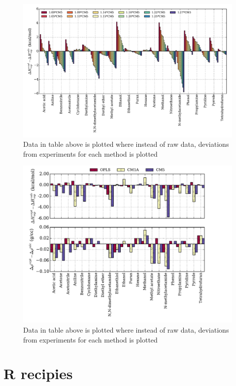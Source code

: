 \documentclass[11pt,fleqn]{book} %
\begin{document}
\begin{figure}
\includegraphics[scale=0.80]{../python_recipies/Thh.pdf}
\caption{Data in table above is plotted where instead of raw data, deviations from experiments for each method is plotted}
\end{figure}
\pagebreak 

\begin{figure}
\includegraphics[scale=0.80]{../python_recipies/Multi_Bar.pdf}
\caption{Data in table above is plotted where instead of raw data, deviations from experiments for each method is plotted}
\end{figure}
\part{R recipies}
\end{document}
